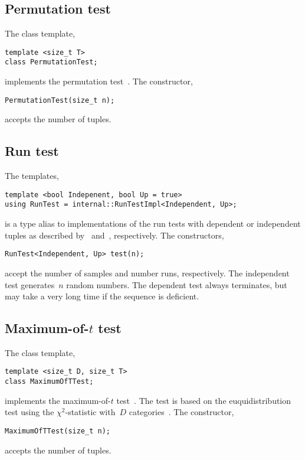 \subsection{Permutation test}
\label{sub:Permutation test}

The class template,
\begin{verbatim}
template <size_t T>
class PermutationTest;
\end{verbatim}
implements the permutation test~\cite[pp.~65]{Knuth:1997us}. The constructor,
\begin{verbatim}
PermutationTest(size_t n);
\end{verbatim}
accepts the number of tuples.

\subsection{Run test}
\label{sub:Run test}

The templates,
\begin{verbatim}
template <bool Indepenent, bool Up = true>
using RunTest = internal::RunTestImpl<Independent, Up>;
\end{verbatim}
is a type alias to implementations of the run tests with dependent or
independent tuples as described by~\cite[pp.~66]{Knuth:1997us}
and~\cite[ex.~14, pp.~77]{Knuth:1997us}, respectively. The constructors,
\begin{verbatim}
RunTest<Independent, Up> test(n);
\end{verbatim}
accept the number of samples and number runs, respectively. The independent
test generates~$n$ random numbers. The dependent test always terminates,
but may take a very long time if the sequence is deficient.

\subsection{Maximum-of-\texorpdfstring{$t$}{t} test}
\label{Maximum-of-t test}

The class template,
\begin{verbatim}
template <size_t D, size_t T>
class MaximumOfTTest;
\end{verbatim}
implements the maximum-of-$t$ test~\cite[pp.~70]{Knuth:1997us}. The test is
based on the euquidistribution test using the $\chi^2$-statistic with~$D$
categories~\cite[pp.~61]{Knuth:1997us}. The constructor,
\begin{verbatim}
MaximumOfTTest(size_t n);
\end{verbatim}
accepts the number of tuples.

